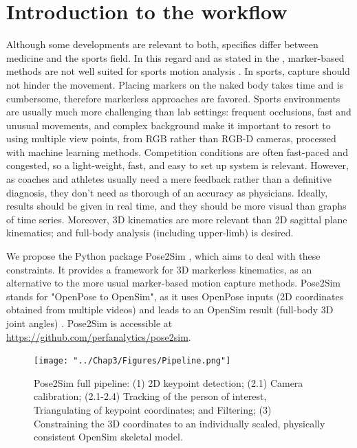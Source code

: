 


\section{Introduction to the workflow}

Although some developments are relevant to both, specifics differ between medicine and the sports field. In this regard and as stated in the , marker-based methods are not well suited for sports motion analysis \cite{Colyer2018}. In sports, capture should not hinder the movement. Placing markers on the naked body takes time and is cumbersome, therefore markerless approaches are favored. Sports environments are usually much more challenging than lab settings: frequent occlusions, fast and unusual movements, and complex background make it important to resort to using multiple view points, from RGB rather than RGB-D cameras, processed with machine learning methods. Competition conditions are often fast-paced and congested, so a light-weight, fast, and easy to set up system is relevant. However, as coaches and athletes usually need a mere feedback rather than a definitive diagnosis, they don't need as thorough of an accuracy as physicians. Ideally, results should be given in real time, and they should be more visual than graphs of time series. Moreover, 3D kinematics are more relevant than 2D sagittal plane kinematics; and full-body analysis (including upper-limb) is desired.

We propose the Python package Pose2Sim \cite{Pagnon2022b}, which aims to deal with these constraints. It provides a framework for 3D markerless kinematics, as an alternative to the more usual marker-based motion capture methods. Pose2Sim stands for "OpenPose to OpenSim", as it uses OpenPose inputs (2D coordinates obtained from multiple videos) \cite{Cao2019} and leads to an OpenSim result (full-body 3D joint angles) \cite{Delp2007,Seth2018}. Pose2Sim is accessible at \url{https://github.com/perfanalytics/pose2sim}.

\begin{figure}[hbtp]
	\centering
	\def\svgwidth{1\columnwidth}
	\fontsize{10pt}{10pt}\selectfont
	\texttt{[image: "../Chap3/Figures/Pipeline.png"]}
	\caption{Pose2Sim full pipeline: (1) 2D keypoint detection; (2.1) Camera calibration; \newline(2.1-2.4) Tracking of the person of interest, Triangulating of keypoint coordinates; and Filtering; (3) Constraining the 3D coordinates to an individually scaled, physically consistent OpenSim skeletal model.}
	\label{fig_pipeline}
\end{figure}

